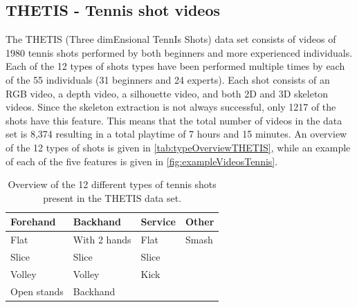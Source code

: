 \subsection{THETIS - Tennis shot videos}
The THETIS (Three dimEnsional TennIs Shots) data set consists of videos of 1980 tennis shots performed by both beginners and more experienced individuals. Each of the 12 types of shots types have been performed multiple times by each of the 55 individuals (31 beginners and 24 experts). Each shot consists of an RGB video, a depth video, a silhouette video, and both 2D and 3D skeleton videos. Since the skeleton extraction is not always successful, only 1217 of the shots have this feature. This means that the total number of videos in the data set is 8,374 resulting in a total playtime of 7 hours and 15 minutes. An overview of the 12 types of shots is given in \autoref{tab:typeOverviewTHETIS}, while an example of each of the five features is given in \autoref{fig:exampleVideosTennis}.

\begin{table}[]
\centering
\caption{Overview of the 12 different types of tennis shots present in the THETIS data set.}
\label{tab:typeOverviewTHETIS}
\begin{tabular}{l|l|l|l}
\textbf{Forehand}    & \textbf{Backhand}     & \textbf{Service} & \textbf{Other} \\ \hline
Flat        & With 2 hands & Flat    & Smash \\
Slice       & Slice        & Slice   &       \\
Volley      & Volley       & Kick    &       \\
Open stands & Backhand     &         &      
\end{tabular}
\end{table}

